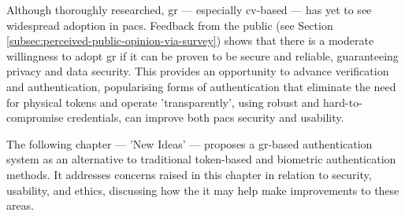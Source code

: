 Although thoroughly researched, \ac{gr} --- especially \ac{cv}-based --- has yet to see widespread adoption in \acs{pacs}. Feedback from the public (see Section \ref{subsec:perceived-public-opinion-via-survey}) shows that there is a moderate willingness to adopt \ac{gr} if it can be proven to be secure and reliable, guaranteeing privacy and data security.
This provides an opportunity to advance verification and authentication, popularising forms of authentication that eliminate the need for physical tokens and operate 'transparently', using robust and hard-to-compromise credentials, can improve both \ac{pacs} security and usability.

The following chapter --- 'New Ideas' --- proposes a \ac{gr}-based authentication system as an alternative to traditional token-based and biometric authentication methods.
It addresses concerns raised in this chapter in relation to security, usability, and ethics, discussing how the it may help make improvements to these areas.